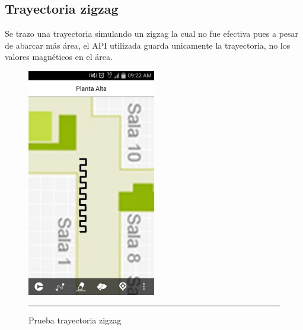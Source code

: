\subsection{Trayectoria zigzag}
Se trazo una trayectoria simulando un zigzag la cual no fue efectiva pues a pesar de abarcar más área, el API utilizada guarda unicamente 
la trayectoria, no los valores magnéticos en el área.
\begin{figure}[h]
	\centering
		\includegraphics[width=0.5\textwidth]{Figuras/zigzag.png}
		\rule{30em}{0.5pt}
	\caption[Prueba trayectoria zigzag]{Prueba trayectoria zigzag}
	\label{fig:vistaPruebaZig}
\end{figure}
\clearpage

